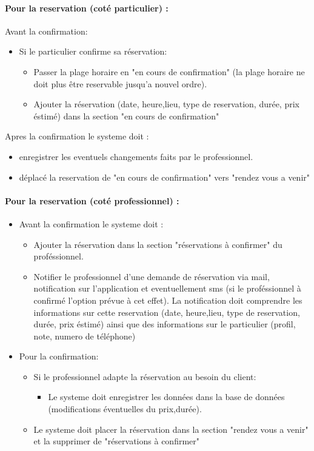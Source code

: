 \documentclass{article}
\begin{document}
\paragraph{Pour la reservation (coté particulier) :}
Avant la confirmation:
	\begin{itemize}
	\item Si le particulier confirme sa réservation:
		\begin{itemize}
		\item Passer la plage horaire en "en cours de confirmation" 
			(la plage horaire ne doit plus être reservable jusqu'a nouvel ordre).
		\item Ajouter la réservation (date, heure,lieu, type de reservation, durée, prix éstimé) dans la section "en cours de confirmation"
		\end{itemize}
	\end{itemize}
Apres la confirmation le systeme doit :
		\begin{itemize}
		\item enregistrer les eventuels changements faits par le professionnel.
		\item déplacé la reservation de "en cours de confirmation" vers "rendez vous a venir"
		\end{itemize}


\paragraph{Pour la reservation (coté professionnel) :}
\begin{itemize}
\item Avant la confirmation le systeme doit :
	\begin{itemize}
	\item Ajouter la réservation dans la section "réservations à confirmer" du  proféssionnel.
    \item Notifier le professionnel d'une demande de réservation via mail, notification sur l'application et eventuellement sms (si le proféssionnel à confirmé l'option prévue à cet effet).
		La notification doit comprendre les informations sur cette reservation (date, heure,lieu, type de reservation, durée, prix éstimé)
		ainsi que des informations sur le particulier (profil, note, numero de téléphone)
	\end{itemize}
\item Pour la confirmation:
	\begin{itemize}
	\item Si le professionnel adapte la réservation au besoin du client:
		\begin{itemize}
		\item Le systeme doit enregistrer les données dans la base de données (modifications éventuelles du prix,durée).
		\end{itemize}
	\end{itemize}
	\begin{itemize}
    \item Le systeme doit placer la réservation dans la section "rendez vous a venir" et la supprimer de "réservations à confirmer"
	\end{itemize}
\end{itemize}
\end{document}
